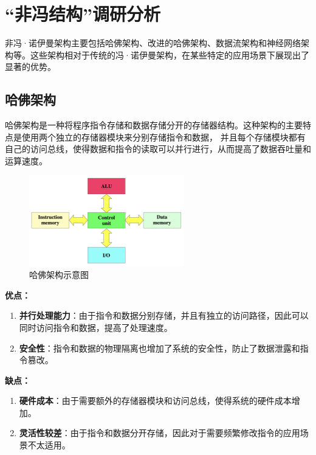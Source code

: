 \documentclass[12pt]{article} %
\theoremstyle{definition}
\begin{document}
\section{“非冯结构”调研分析}

非冯·诺伊曼架构主要包括哈佛架构、改进的哈佛架构、数据流架构和神经网络架构等\cite{Siriwardhane2020ComputerArchitecture}。这些架构相对于传统的冯·诺伊曼架构，在某些特定的应用场景下展现出了显著的优势。

\subsection{哈佛架构}

哈佛架构是一种将程序指令存储和数据存储分开的存储器结构。这种架构的主要特点是使用两个独立的存储器模块来分别存储指令和数据，
并且每个存储模块都有自己的访问总线，使得数据和指令的读取可以并行进行，从而提高了数据吞吐量和运算速度\cite{HarvardArchitecture, Pawson2022MythHarvard}。

\begin{figure}[h]
  \centering
  \includegraphics[width=0.6\textwidth]{./figs/Harvard_architecture.png}
  \caption{哈佛架构示意图\cite{HarvardArchitecture}}
  \label{fig:harvard-architecture}
\end{figure}

\textbf{优点：}
\begin{enumerate}
  \item \textbf{并行处理能力}：由于指令和数据分别存储，并且有独立的访问路径，因此可以同时访问指令和数据，提高了处理速度。
  \item \textbf{安全性}：指令和数据的物理隔离也增加了系统的安全性，防止了数据泄露和指令篡改。
\end{enumerate}

\textbf{缺点：}
\begin{enumerate}
  \item \textbf{硬件成本}：由于需要额外的存储器模块和访问总线，使得系统的硬件成本增加。
  \item \textbf{灵活性较差}：由于指令和数据分开存储，因此对于需要频繁修改指令的应用场景不太适用。
\end{enumerate}
\end{document}
